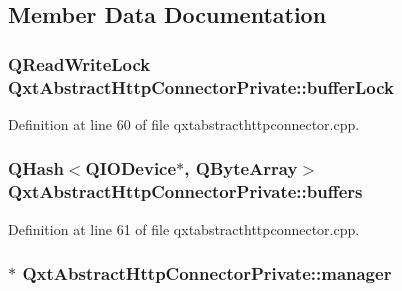 \subsection{Member Data Documentation}
\hypertarget{class_qxt_abstract_http_connector_private_a7c0c81569b640368977753d1b079c868}{
\subsubsection[{buffer\-Lock}]{\setlength{\rightskip}{0pt plus 5cm}Q\-Read\-Write\-Lock Qxt\-Abstract\-Http\-Connector\-Private\-::buffer\-Lock}}\label{class_qxt_abstract_http_connector_private_a7c0c81569b640368977753d1b079c868}


Definition at line 60 of file qxtabstracthttpconnector.\-cpp.

\hypertarget{class_qxt_abstract_http_connector_private_ad310cf11762eb76a619b2fe0760265e4}{
\subsubsection[{buffers}]{\setlength{\rightskip}{0pt plus 5cm}Q\-Hash$<$Q\-I\-O\-Device$\ast$, Q\-Byte\-Array$>$ Qxt\-Abstract\-Http\-Connector\-Private\-::buffers}}\label{class_qxt_abstract_http_connector_private_ad310cf11762eb76a619b2fe0760265e4}


Definition at line 61 of file qxtabstracthttpconnector.\-cpp.

\hypertarget{class_qxt_abstract_http_connector_private_a9dc8bd81f53b4a8e5861f9a46321d716}{
\subsubsection[{manager}]{$\ast$ Qxt\-Abstract\-Http\-Connector\-Private\-::manager}}\label{class_qxt_abstract_http_connector_private_a9dc8bd81f53b4a8e5861f9a46321d716}


